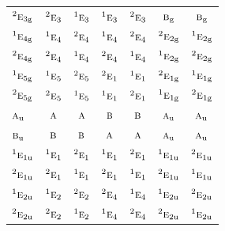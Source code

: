\documentclass[10pt,a4paper]{article}
\numberwithin{equation}{section}
\newcommand{\irr}[1]{\text{\normalfont\scshape #1}}
\newcommand{\conjpair}[1]{{}^{#1}}
\newcommand{\ptag}[1]{\mathrm{#1}}
\begin{document}
{\begin{longtable}{@{}lcccccc@{}}
$\conjpair{2}\irr{e}_{3\ptag{g}}$ & $\conjpair{2}\irr{e}_{3}$ & $\conjpair{1}\irr{e}_{3}$ & $\conjpair{1}\irr{e}_{3}$ & $\conjpair{2}\irr{e}_{3}$ & $\irr{b}_{\ptag{g}}$ & $\irr{b}_{\ptag{g}}$\\
$\conjpair{1}\irr{e}_{4\ptag{g}}$ & $\conjpair{1}\irr{e}_{4}$ & $\conjpair{2}\irr{e}_{4}$ & $\conjpair{1}\irr{e}_{4}$ & $\conjpair{2}\irr{e}_{4}$ & $\conjpair{2}\irr{e}_{2\ptag{g}}$ & $\conjpair{1}\irr{e}_{2\ptag{g}}$\\
$\conjpair{2}\irr{e}_{4\ptag{g}}$ & $\conjpair{2}\irr{e}_{4}$ & $\conjpair{1}\irr{e}_{4}$ & $\conjpair{2}\irr{e}_{4}$ & $\conjpair{1}\irr{e}_{4}$ & $\conjpair{1}\irr{e}_{2\ptag{g}}$ & $\conjpair{2}\irr{e}_{2\ptag{g}}$\\
$\conjpair{1}\irr{e}_{5\ptag{g}}$ & $\conjpair{1}\irr{e}_{5}$ & $\conjpair{2}\irr{e}_{5}$ & $\conjpair{2}\irr{e}_{1}$ & $\conjpair{1}\irr{e}_{1}$ & $\conjpair{2}\irr{e}_{1\ptag{g}}$ & $\conjpair{1}\irr{e}_{1\ptag{g}}$\\
$\conjpair{2}\irr{e}_{5\ptag{g}}$ & $\conjpair{2}\irr{e}_{5}$ & $\conjpair{1}\irr{e}_{5}$ & $\conjpair{1}\irr{e}_{1}$ & $\conjpair{2}\irr{e}_{1}$ & $\conjpair{1}\irr{e}_{1\ptag{g}}$ & $\conjpair{2}\irr{e}_{1\ptag{g}}$\\
$\irr{a}_{\ptag{u}}$ & $\irr{a}$ & $\irr{a}$ & $\irr{b}$ & $\irr{b}$ & $\irr{a}_{\ptag{u}}$ & $\irr{a}_{\ptag{u}}$\\
$\irr{b}_{\ptag{u}}$ & $\irr{b}$ & $\irr{b}$ & $\irr{a}$ & $\irr{a}$ & $\irr{a}_{\ptag{u}}$ & $\irr{a}_{\ptag{u}}$\\
$\conjpair{1}\irr{e}_{1\ptag{u}}$ & $\conjpair{1}\irr{e}_{1}$ & $\conjpair{2}\irr{e}_{1}$ & $\conjpair{1}\irr{e}_{1}$ & $\conjpair{2}\irr{e}_{1}$ & $\conjpair{1}\irr{e}_{1\ptag{u}}$ & $\conjpair{2}\irr{e}_{1\ptag{u}}$\\
$\conjpair{2}\irr{e}_{1\ptag{u}}$ & $\conjpair{2}\irr{e}_{1}$ & $\conjpair{1}\irr{e}_{1}$ & $\conjpair{2}\irr{e}_{1}$ & $\conjpair{1}\irr{e}_{1}$ & $\conjpair{2}\irr{e}_{1\ptag{u}}$ & $\conjpair{1}\irr{e}_{1\ptag{u}}$\\
$\conjpair{1}\irr{e}_{2\ptag{u}}$ & $\conjpair{1}\irr{e}_{2}$ & $\conjpair{2}\irr{e}_{2}$ & $\conjpair{2}\irr{e}_{4}$ & $\conjpair{1}\irr{e}_{4}$ & $\conjpair{1}\irr{e}_{2\ptag{u}}$ & $\conjpair{2}\irr{e}_{2\ptag{u}}$\\
$\conjpair{2}\irr{e}_{2\ptag{u}}$ & $\conjpair{2}\irr{e}_{2}$ & $\conjpair{1}\irr{e}_{2}$ & $\conjpair{1}\irr{e}_{4}$ & $\conjpair{2}\irr{e}_{4}$ & $\conjpair{2}\irr{e}_{2\ptag{u}}$ & $\conjpair{1}\irr{e}_{2\ptag{u}}$\\

\end{longtable}}
\end{document}
